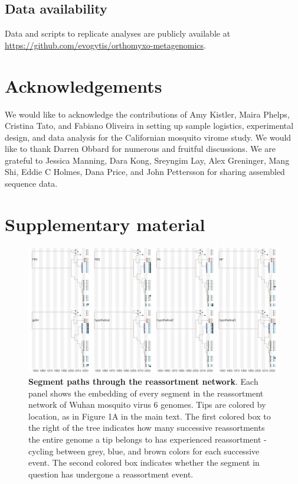 \documentclass[11pt,twocolumn]{article}
\begin{document}
\subsection{Data availability}

Data and scripts to replicate analyses are publicly available at \url{https://github.com/evogytis/orthomyxo-metagenomics}.

\section{Acknowledgements}
We would like to acknowledge the contributions of Amy Kistler, Maira Phelps, Cristina Tato, and Fabiano Oliveira in setting up sample logistics, experimental design, and data analysis for the Californian mosquito virome study.
We would like to thank Darren Obbard for numerous and fruitful discussions.
We are grateful to Jessica Manning, Dara Kong, Sreyngim Lay, Alex Greninger, Mang Shi, Eddie C Holmes, Dana Price, and John Pettersson for sharing assembled sequence data.




\onecolumn

\setcounter{figure}{0}
\setcounter{table}{0}
\renewcommand{\thefigure}{S\arabic{figure}}
\renewcommand{\thetable}{S\arabic{table}}


\newpage

\section{Supplementary material}

\pagebreak

\begin{figure}
\centering
\includegraphics[width=\textwidth]{SuppFig1_clonal.png}
\caption{
\textbf{Segment paths through the reassortment network}.
Each panel shows the embedding of every segment in the reassortment network of Wuhan mosquito virus 6 genomes.
Tips are colored by location, as in Figure 1A in the main text.
The first colored box to the right of the tree indicates how many successive reassortments the entire genome a tip belongs to has experienced reassortment - cycling between grey, blue, and brown colors for each successive event.
The second colored box indicates whether the segment in question has undergone a reassortment event.
}
\end{figure}
\end{document}
